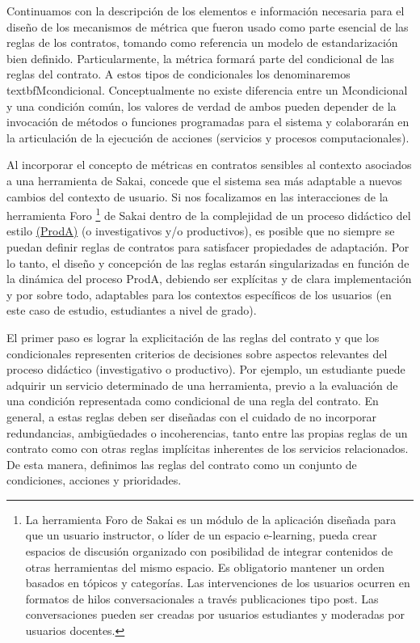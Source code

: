 Continuamos con la descripción de los elementos e información necesaria para el diseño de los mecanismos de métrica que fueron usado como parte esencial de las reglas de los contratos, tomando como referencia un modelo de estandarización bien definido. Particularmente, la métrica formará parte del condicional de las reglas del contrato. A estos tipos de condicionales los denominaremos textbf{Mcondicional}. Conceptualmente no existe diferencia entre un Mcondicional y una condición común, los valores de verdad de ambos pueden depender de la invocación de métodos o funciones programadas para el sistema y colaborarán en la articulación de la ejecución de acciones (servicios y procesos computacionales). 

Al incorporar el concepto de métricas en contratos sensibles al contexto asociados a una herramienta de Sakai, concede que el sistema sea más adaptable a nuevos cambios del contexto de usuario. Si nos focalizamos en las interacciones de la herramienta Foro \footnote{La herramienta Foro de Sakai es un módulo de la aplicación diseñada para que un usuario instructor, o líder de un espacio e-learning, pueda crear espacios de discusión organizado con posibilidad de integrar contenidos de otras herramientas del mismo espacio. Es obligatorio mantener un orden basados en tópicos y categorías. Las intervenciones de los usuarios ocurren en formatos de hilos conversacionales a través publicaciones tipo post. Las conversaciones pueden ser creadas por usuarios estudiantes y moderadas por usuarios docentes.} de Sakai dentro de la complejidad de un proceso didáctico del estilo \hyperref[ProdA]{(ProdA)} (o investigativos y/o productivos), es posible que no siempre se puedan definir reglas de contratos para satisfacer propiedades de adaptación. Por lo tanto, el diseño y concepción de las reglas estarán singularizadas en función de la dinámica del proceso ProdA, debiendo ser explícitas y de clara implementación y por sobre todo, adaptables para los contextos específicos de los usuarios (en este caso de estudio, estudiantes a nivel de grado).


El primer paso es lograr la explicitación de las reglas del contrato y que los condicionales representen criterios de decisiones sobre aspectos relevantes del proceso didáctico (investigativo o productivo). Por ejemplo, un estudiante puede adquirir un servicio determinado de una herramienta, previo a la evaluación de una condición representada como condicional de una regla del contrato. En general, a estas reglas deben ser diseñadas con el cuidado de no incorporar
redundancias, ambigüedades o incoherencias, tanto entre las propias reglas de un contrato como con otras reglas implícitas inherentes de los servicios relacionados. De esta manera, definimos las reglas del contrato como un conjunto de condiciones, acciones y prioridades.

